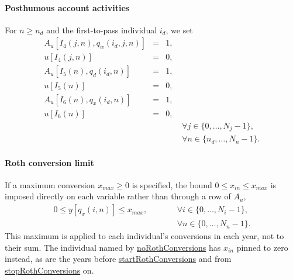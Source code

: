 \documentclass[fleqn,12pt]{report}
\newcommand{\code}[1]{\url{#1}}
\begin{document}
\paragraph*{Posthumous account activities}
For $n \ge n_d$ and the first-to-pass individual $i_d$, we set
\begin{eqnarray}
	A_u[I_4(j, n), q_{w}(i_d, j, n)] &=& 1, \nonumber \\
	u[I_4(j, n)] &=& 0, \nonumber \\
	A_u[I_5(n), q_{d}(i_d, n)] &=& 1, \nonumber \\
	u[I_5(n)] &=& 0, \nonumber \\
	A_u[I_6(n), q_{x}(i_d, n)] &=& 1, \nonumber \\
	u[I_6(n)] &=& 0, \nonumber \\
	&&\qquad\forall j \in \{0,\ldots, N_j - 1\},\nonumber\\
	&&\qquad\forall n \in \{n_d,\ldots, N_n - 1\}. \nonumber
\end{eqnarray}

\paragraph*{Roth conversion limit}
If a maximum conversion $x_{max} \ge 0$ is specified, the bound
$0 \le x_{in} \le x_{max}$ is imposed directly on each variable rather than through a row of $A_u$,
\begin{eqnarray}
	0 \le y[q_x(i, n)] \le x_{max},
	&&\qquad\forall i \in \{0,\ldots, N_i - 1\},\nonumber\\
	&&\qquad\forall n \in \{0,\ldots, N_n - 1\}. \nonumber
\end{eqnarray}
This maximum is applied to each individual's conversions in each year, not to their sum.
The individual named by \code{noRothConversions} has $x_{in}$ pinned to zero instead,
as are the years before \code{startRothConversions} and from \code{stopRothConversions} on.
\end{document}
